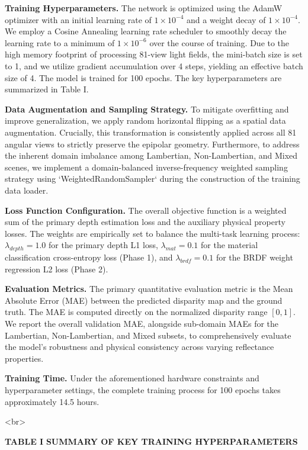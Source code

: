 \documentclass[lettersize,journal]{IEEEtran}
\begin{document}
\textbf{Training Hyperparameters.} 
The network is optimized using the AdamW optimizer with an initial learning rate of $1 \times 10^{-4}$ and a weight decay of $1 \times 10^{-4}$. We employ a Cosine Annealing learning rate scheduler to smoothly decay the learning rate to a minimum of $1 \times 10^{-6}$ over the course of training. Due to the high memory footprint of processing 81-view light fields, the mini-batch size is set to 1, and we utilize gradient accumulation over 4 steps, yielding an effective batch size of 4. The model is trained for 100 epochs. The key hyperparameters are summarized in Table I.

\textbf{Data Augmentation and Sampling Strategy.} 
To mitigate overfitting and improve generalization, we apply random horizontal flipping as a spatial data augmentation. Crucially, this transformation is consistently applied across all 81 angular views to strictly preserve the epipolar geometry. Furthermore, to address the inherent domain imbalance among Lambertian, Non-Lambertian, and Mixed scenes, we implement a domain-balanced inverse-frequency weighted sampling strategy using `WeightedRandomSampler` during the construction of the training data loader.

\textbf{Loss Function Configuration.} 
The overall objective function is a weighted sum of the primary depth estimation loss and the auxiliary physical property losses. The weights are empirically set to balance the multi-task learning process: $\lambda_{depth} = 1.0$ for the primary depth L1 loss, $\lambda_{mat} = 0.1$ for the material classification cross-entropy loss (Phase 1), and $\lambda_{brdf} = 0.1$ for the BRDF weight regression L2 loss (Phase 2). 

\textbf{Evaluation Metrics.} 
The primary quantitative evaluation metric is the Mean Absolute Error (MAE) between the predicted disparity map and the ground truth. The MAE is computed directly on the normalized disparity range $[0, 1]$. We report the overall validation MAE, alongside sub-domain MAEs for the Lambertian, Non-Lambertian, and Mixed subsets, to comprehensively evaluate the model's robustness and physical consistency across varying reflectance properties.

\textbf{Training Time.} 
Under the aforementioned hardware constraints and hyperparameter settings, the complete training process for 100 epochs takes approximately 14.5 hours.

<br>

\textbf{TABLE I}
\textbf{SUMMARY OF KEY TRAINING HYPERPARAMETERS}
\end{document}
